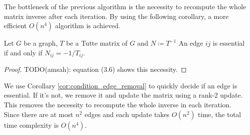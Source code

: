 The bottleneck of the previous algorithm is the necessity to recompute the whole matrix inverse after each iteration.
By using the following corollary, a more efficient \(O(n^4)\) algorithm is achieved.

\begin{corollary}
    \label{cor:condition_edge_removal}
    Let \(G\) be a graph, \(T\) be a Tutte matrix of \(G\) and \(N \coloneqq T^{-1}\)
    An edge \(ij\) is essential if and only if \(N_{ij} = -1/T_{ij}\).
\end{corollary}

\begin{proof}
    TODO(amsah): equation (3.6) shows this necessity.
\end{proof}

We use Corollary \ref{cor:condition_edge_removal} to quickly decide if an edge is essential. 
If it's not, we remove it and update the matrix using a rank-2 update. 
This removes the necessity to recompute the whole inverse in each iteration.
Since there are at most \(n^2\) edges and each update takes \(O(n^2)\) time, the total time complexity is \(O(n^4)\).
